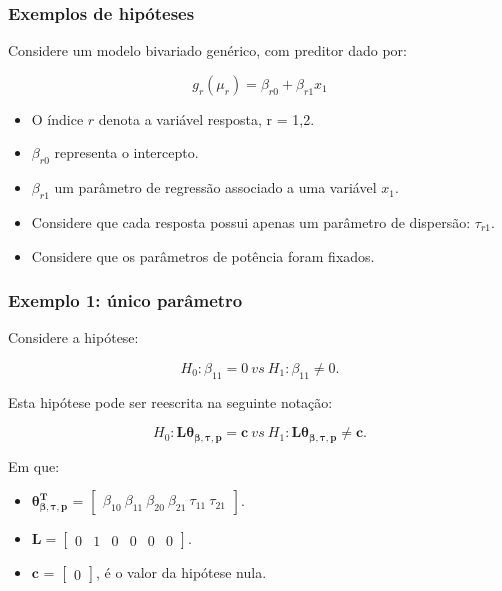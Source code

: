 \documentclass[10pt,
  aspectratio=169,
  serif,
  mathserif,
  professionalfont,
  compress,
  handout,
  ]{beamer}\usepackage[]{graphicx}\usepackage[]{color}
\begin{document}

\begin{frame}

\frametitle{Exemplos de hipóteses}

Considere um modelo bivariado genérico, com preditor dado por:

$$g_r(\mu_r) = \beta_{r0} + \beta_{r1} x_1$$

\begin{itemize}
  
  \item O índice $r$ denota a variável resposta, r = 1,2.
  
  \item $\beta_{r0}$ representa o intercepto.
  
  \item $\beta_{r1}$ um parâmetro de regressão associado a uma variável $x_1$.
  
  \item Considere que cada resposta possui apenas um parâmetro de dispersão: $\tau_{r1}$.
  
  \item Considere que os parâmetros de potência foram fixados.
  
\end{itemize}

\end{frame}


\begin{frame}

\frametitle{Exemplo 1: único parâmetro}

Considere a hipótese:

$$H_0: \beta_{11} = 0 \ vs \ H_1: \beta_{11} \neq 0.$$

Esta hipótese pode ser reescrita na seguinte notação:

$$H_0: \boldsymbol{L}\boldsymbol{\theta_{\beta,\tau,p}} = \boldsymbol{c} \ vs \ H_1: \boldsymbol{L}\boldsymbol{\theta_{\beta,\tau,p}} \neq \boldsymbol{c}.$$ 

Em que:

\begin{itemize}
  
  \item $\boldsymbol{\theta_{\beta,\tau,p}^T}$ = $\begin{bmatrix} \beta_{10} \  \beta_{11} \ \beta_{20} \ \beta_{21} \ \tau_{11} \ \tau_{21} \end{bmatrix}$.


\item $\boldsymbol{L} = \begin{bmatrix} 0 & 1 & 0 & 0 & 0 & 0  \end{bmatrix}.$
 
\item $\boldsymbol{c}$ = $\begin{bmatrix} 0 \end{bmatrix}$, é o valor da hipótese nula. 

\end{itemize}

\end{frame}
\end{document}
